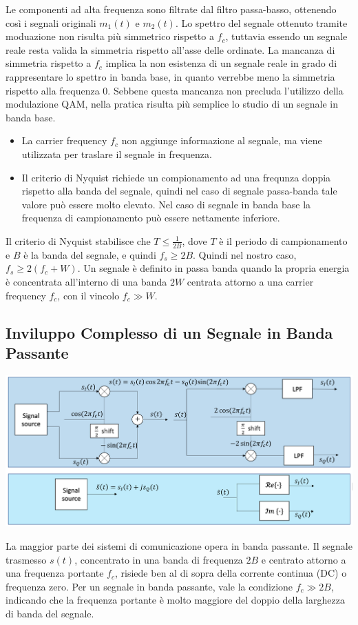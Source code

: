Le componenti ad alta frequenza sono filtrate dal filtro passa-basso, ottenendo così i segnali originali \( m_1(t) \) e \( m_2(t) \).
Lo spettro del segnale ottenuto tramite moduazione non risulta più simmetrico rispetto a $f_c$, tuttavia essendo un segnale reale resta valida la simmetria rispetto all'asse delle ordinate.
La mancanza di simmetria rispetto a $f_c$ implica la non esistenza di un segnale reale in grado di rappresentare lo spettro in banda base, in quanto verrebbe meno la simmetria rispetto alla frequenza 0.
Sebbene questa mancanza non precluda l'utilizzo della modulazione QAM, nella pratica risulta più semplice lo studio di un segnale in banda base.
\begin{itemize}
    \item La carrier frequency \( f_c \) non aggiunge informazione al segnale, ma viene utilizzata per traslare il segnale in frequenza.
    \item Il criterio di Nyquist richiede un compionamento ad una frequnza doppia rispetto alla banda del segnale, quindi nel caso di segnale passa-banda tale valore può essere molto elevato. Nel caso di segnale in banda base la frequenza di campionamento può essere nettamente inferiore.
\end{itemize}

Il criterio di Nyquist stabilisce che \( T \leq \frac{1}{2B} \), dove \( T \) è il periodo di campionamento e \( B \) è la banda del segnale, e quindi \( f_s \geq 2B \). Quindi nel nostro caso, $f_s \geq 2(f_c + W)$.
Un segnale è definito in passa banda quando la propria energia è concentrata all'interno di una banda $2W$ centrata attorno a una carrier frequency $f_c$, con il vincolo $f_c \gg W$.  

\subsection*{Inviluppo Complesso di un Segnale in Banda Passante}
\begin{center}
    \includegraphics[width=1\textwidth]{imgs/complex_envelope.png}
\end{center}
La maggior parte dei sistemi di comunicazione opera in banda passante. Il segnale trasmesso \( s(t) \), concentrato in una banda di frequenza \( 2B \) e centrato attorno a una frequenza portante \( f_c \), risiede ben al di sopra della corrente continua (DC) o frequenza zero. Per un segnale in banda passante, vale la condizione \( f_c \gg 2B \), indicando che la frequenza portante è molto maggiore del doppio della larghezza di banda del segnale.

